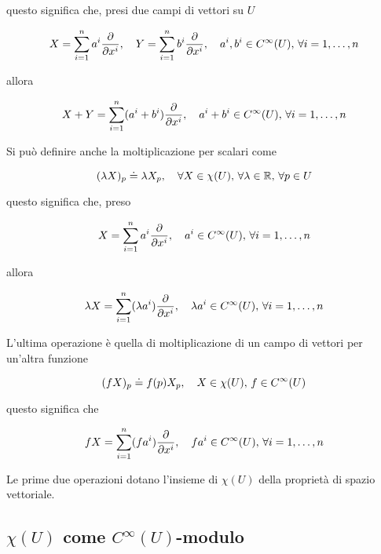 questo significa che, presi due campi di vettori su $ U $

\begin{equation}
	X = \sum_{i=1}^{n} a^{i} \pdv{x^{i}} %
	\qcomma Y = \sum_{i=1}^{n} b^{i} \pdv{x^{i}} %
	\qcomma a^{i},b^{i} \in C^{\infty}(U), \, \forall i = 1, \dots, n
\end{equation}

allora

\begin{equation}
	X + Y = \sum_{i=1}^{n} (a^{i}+b^{i}) \pdv{x^{i}} %
	\qcomma a^{i} + b^{i} \in C^{\infty}(U), \, \forall i = 1, \dots, n
\end{equation}

Si può definire anche la moltiplicazione per scalari come

\begin{equation}
	(\lambda X)_{p} \doteq \lambda X_{p} \qcomma \forall X \in \chi(U), \, \forall \lambda \in \R, \, \forall p \in U
\end{equation}

questo significa che, preso

\begin{equation}
	X = \sum_{i=1}^{n} a^{i} \pdv{x^{i}} %
	\qcomma a^{i} \in C^{\infty}(U), \, \forall i = 1, \dots, n
\end{equation}

allora

\begin{equation}
	\lambda X = \sum_{i=1}^{n} (\lambda a^{i}) \pdv{x^{i}} %
	\qcomma \lambda a^{i} \in C^{\infty}(U), \, \forall i = 1, \dots, n
\end{equation}

L'ultima operazione è quella di moltiplicazione di un campo di vettori per un'altra funzione

\begin{equation}
	(f X)_{p} \doteq f(p) X_{p} %
	\qcomma X \in \chi(U), \, f \in C^{\infty}(U)
\end{equation}

questo significa che

\begin{equation}
	f X = \sum_{i=1}^{n} (f a^{i}) \pdv{x^{i}} %
	\qcomma f a^{i} \in C^{\infty}(U), \, \forall i = 1, \dots, n
\end{equation}

Le prime due operazioni dotano l'insieme di $ \chi(U) $ della proprietà di spazio vettoriale.

\subsection{$ \chi(U) $ come $ C^{\infty}(U) $-modulo}

